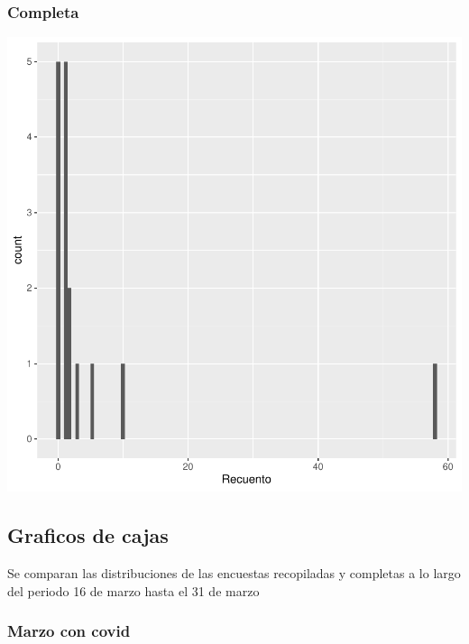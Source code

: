 \documentclass{article}
\begin{document}
\subsubsection{Completa}

\includegraphics{seguimento2-061}

\subsection{Graficos de cajas}
Se comparan las distribuciones de las encuestas recopiladas y completas a lo largo del periodo 16 de marzo hasta el 31 de marzo

\subsubsection{Marzo con covid}
\end{document}
